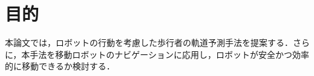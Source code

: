 
\section{目的}
本論文では，ロボットの行動を考慮した歩行者の軌道予測手法を提案する．さらに，本手法を移動ロボットのナビゲーションに応用し，ロボットが安全かつ効率的に移動できるか検討する．

